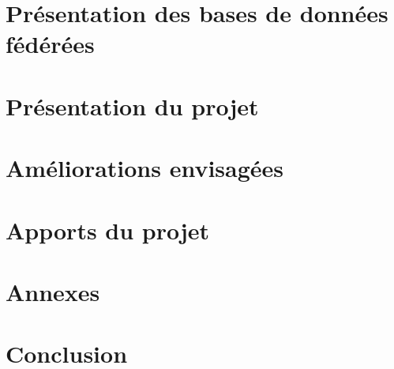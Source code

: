 \documentclass[10pt,a4paper]{report}
\begin{document}
\chapter{Présentation des bases de données fédérées}


\chapter{Présentation du projet}


\chapter{Améliorations envisagées}


\chapter{Apports du projet}


\chapter*{Annexes} 





\chapter*{Conclusion}

\end{document}
